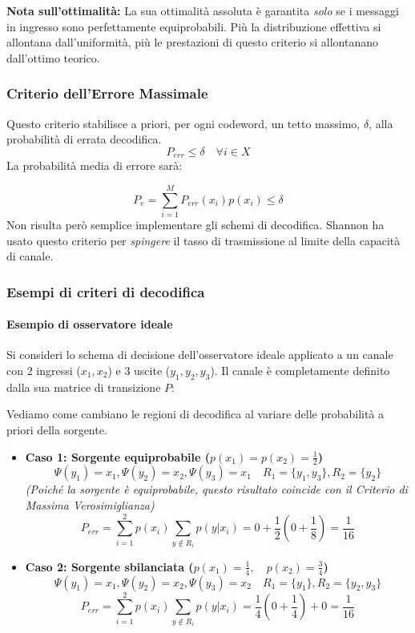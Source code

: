 \noindent \colorbox{gray!15}{\textbf{Nota sull'ottimalità:}} La sua ottimalità assoluta è garantita \textit{solo} se i messaggi in ingresso sono perfettamente equiprobabili. Più la distribuzione effettiva si allontana dall'uniformità, più le prestazioni di questo criterio si allontanano dall'ottimo teorico.

\subsubsection{Criterio dell'Errore Massimale}
Questo criterio stabilisce a priori, per ogni codeword, un tetto massimo, $\delta$, alla probabilità di errata decodifica.
\[P_{err}\leq \delta \quad \forall i \in X\]
La probabilità media di errore sarà:

\[P_e=\sum_{i=1}^MP_{err}(x_i)p(x_i)\leq \delta\]
Non risulta però semplice implementare gli schemi di decodifica. Shannon ha usato questo criterio per \textit{spingere} il tasso di trasmissione al limite della capacità di canale.

\subsubsection{Esempi di criteri di decodifica}
\paragraph{Esempio di osservatore ideale}
Si consideri lo schema di decisione dell'osservatore ideale applicato a un canale con 2 ingressi ($x_1, x_2$) e 3 uscite ($y_1, y_2, y_3$). Il canale è completamente definito dalla sua matrice di transizione $P$:


Vediamo come cambiano le regioni di decodifica al variare delle probabilità a priori della sorgente.

\begin{itemize}
    \item \textbf{Caso 1: Sorgente equiprobabile ($p(x_1)=p(x_2) = \frac{1}{2}$)}
    \[\Psi(y_1)=x_1,\Psi(y_2)=x_2,\Psi(y_3)=x_1 \quad  R_1=\{y_1,y_3\},R_2=\{y_2\}\]
    \textit{(Poiché la sorgente è equiprobabile, questo risultato coincide con il Criterio di Massima Verosimiglianza)}
    \[P_{err}= \sum_{i=1}^2 p(x_i) \sum_{y \notin R_i}p(y|x_i)= 0 + \frac{1}{2}\left(0+\frac{1}{8}\right)= \frac{1}{16}\]
    \item \textbf{Caso 2: Sorgente sbilanciata ($p(x_1)=\frac{1}{4}, \quad p(x_2) = \frac{3}{4}$)}
    \[\Psi(y_1)=x_1,\Psi(y_2)=x_2,\Psi(y_3)=x_2 \quad  R_1=\{y_1\},R_2=\{y_2,y_3\}\]
    \[P_{err}= \sum_{i=1}^2 p(x_i) \sum_{y \notin R_i}p(y|x_i)= \frac{1}{4}\left(0+\frac{1}{4}\right) + 0 = \frac{1}{16}\]
\end{itemize}

